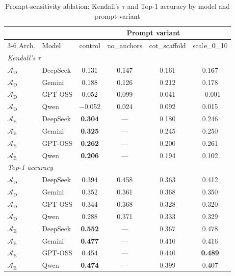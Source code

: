 \documentclass[11pt]{article}
\begin{document}
\begin{table}[htbp]
\centering
\footnotesize
\centering
\caption{Prompt-sensitivity ablation: Kendall's $\tau$ and Top-1 accuracy by model and prompt variant}
\label{tab:prompt_ablation}
\renewcommand{\arraystretch}{1.15}
\setlength{\tabcolsep}{4pt}
\begin{tabular}{llcccc}
\toprule
& & \multicolumn{4}{c}{Prompt variant} \\
\cmidrule(lr){3-6}
Arch. & Model & control & no\_anchors & cot\_scaffold & scale\_0\_10 \\
\midrule
\multicolumn{6}{l}{\emph{Kendall's $\tau$}} \\
$\mathcal{A}_{\text{D}}$ & DeepSeek & 0.131 & 0.147 & 0.161 & 0.167 \\
$\mathcal{A}_{\text{D}}$ & Gemini   & 0.188 & 0.126 & 0.212 & 0.178 \\
$\mathcal{A}_{\text{D}}$ & GPT-OSS  & 0.052 & 0.099 & 0.041 & $-$0.001 \\
$\mathcal{A}_{\text{D}}$ & Qwen     & $-$0.052 & 0.024 & 0.092 & 0.015 \\
$\mathcal{A}_{\text{E}}$ & DeepSeek & \textbf{0.304} & --- & 0.180 & 0.246 \\
$\mathcal{A}_{\text{E}}$ & Gemini   & \textbf{0.325} & --- & 0.245 & 0.250 \\
$\mathcal{A}_{\text{E}}$ & GPT-OSS  & \textbf{0.262} & --- & 0.200 & 0.261 \\
$\mathcal{A}_{\text{E}}$ & Qwen     & \textbf{0.206} & --- & 0.194 & 0.102 \\
\midrule
\multicolumn{6}{l}{\emph{Top-1 accuracy}} \\
$\mathcal{A}_{\text{D}}$ & DeepSeek & 0.394 & 0.458 & 0.363 & 0.412 \\
$\mathcal{A}_{\text{D}}$ & Gemini   & 0.352 & 0.361 & 0.368 & 0.350 \\
$\mathcal{A}_{\text{D}}$ & GPT-OSS  & 0.344 & 0.368 & 0.328 & 0.320 \\
$\mathcal{A}_{\text{D}}$ & Qwen     & 0.288 & 0.371 & 0.333 & 0.329 \\
$\mathcal{A}_{\text{E}}$ & DeepSeek & \textbf{0.552} & --- & 0.367 & 0.478 \\
$\mathcal{A}_{\text{E}}$ & Gemini   & \textbf{0.477} & --- & 0.410 & 0.416 \\
$\mathcal{A}_{\text{E}}$ & GPT-OSS  & 0.454 & --- & 0.440 & \textbf{0.489} \\
$\mathcal{A}_{\text{E}}$ & Qwen     & \textbf{0.474} & --- & 0.399 & 0.407 \\
\bottomrule
\end{tabular}
\setlength{\tabcolsep}{6pt}
\renewcommand{\arraystretch}{1.0}
\end{table}
\end{document}

